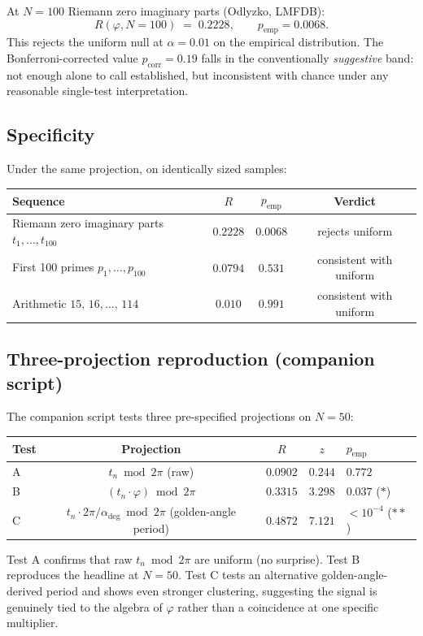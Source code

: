 \documentclass[11pt,a4paper]{article}
\begin{document}
At $N = 100$ Riemann zero imaginary parts (Odlyzko, LMFDB):
\[
   R(\varphi, N{=}100) \;=\; 0.2228, \qquad p_{\text{emp}} = 0.0068.
\]
This rejects the uniform null at $\alpha = 0.01$ on the empirical
distribution. The Bonferroni-corrected value
$p_{\text{corr}} = 0.19$ falls in the conventionally
\emph{suggestive} band: not enough alone to call established, but
inconsistent with chance under any reasonable single-test interpretation.

\subsection{Specificity}

Under the same projection, on identically sized samples:
\begin{center}
\begin{tabular}{lccc}
\toprule
Sequence                                   & $R$       & $p_{\text{emp}}$ & Verdict \\
\midrule
Riemann zero imaginary parts $t_1,\dots,t_{100}$ & $0.2228$ & $0.0068$  & rejects uniform \\
First 100 primes $p_1,\dots,p_{100}$       & $0.0794$  & $0.531$  & consistent with uniform \\
Arithmetic $15,\,16,\dots,\,114$           & $0.010$   & $0.991$  & consistent with uniform \\
\bottomrule
\end{tabular}
\end{center}

\subsection{Three-projection reproduction (companion script)}

The companion script tests three pre-specified projections on $N = 50$:
\begin{center}
\begin{tabular}{lcccl}
\toprule
Test & Projection & $R$ & $z$ & $p_{\text{emp}}$ \\
\midrule
A & $t_n \bmod 2\pi$ (raw)                                 & $0.0902$ & $0.244$ & $0.772$ \\
B & $(t_n \cdot \varphi) \bmod 2\pi$                       & $0.3315$ & $3.298$ & $0.037$ \quad ($\ast$) \\
C & $t_n \cdot 2\pi/\alpha_{\text{deg}} \bmod 2\pi$ (golden-angle period) & $0.4872$ & $7.121$ & $< 10^{-4}$ \quad ($\ast\ast$) \\
\bottomrule
\end{tabular}
\end{center}
Test A confirms that raw $t_n \bmod 2\pi$ are uniform (no surprise). Test B
reproduces the headline at $N=50$. Test C tests an alternative
golden-angle-derived period and shows even stronger clustering, suggesting
the signal is genuinely tied to the algebra of $\varphi$ rather than a
coincidence at one specific multiplier.
\end{document}
